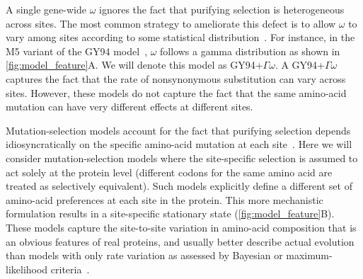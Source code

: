 \documentclass[11pt]{article}
\begin{document}
A single gene-wide $\omega$ ignores the fact that purifying selection is heterogeneous across sites.
The most common strategy to ameliorate this defect is to allow $\omega$ to vary among sites according to some statistical distribution~\citep{yang1994maximum,yang2000codon}.
For instance, in the M5 variant of the GY94 model~\citep{yang2000codon}, $\omega$ follows a gamma distribution as shown in \ref{fig:model_feature}A.
We will denote this model as GY94+$\Gamma\omega$.
A GY94+$\Gamma\omega$ captures the fact that the rate of nonsynonymous substitution can vary across sites. 
However, these models do not capture the fact that the same amino-acid mutation can have very different effects at different sites. 

Mutation-selection models account for the fact that purifying selection depends idiosyncratically on the specific amino-acid mutation at each site~\citep{halpern1998evolutionary,yang2008mutation,rodrigue2010mutation,tamuri2012estimating,mccandlish2014modeling}.
Here we will consider mutation-selection models where the site-specific selection is assumed to act solely at the protein level (different codons for the same amino acid are treated as selectively equivalent).
Such models explicitly define a different set of amino-acid preferences at each site in the protein. 
This more mechanistic formulation results in a site-specific stationary state (\ref{fig:model_feature}B). 
These models capture the site-to-site variation in amino-acid composition that is an obvious features of real proteins, and usually better describe actual evolution than models with only rate variation as assessed by Bayesian or maximum-likelihood criteria~\citep{lartillot2004bayesian, le2008phylogenetic, si2008empirical, wang2008class, rodrigue2010mutation,bloom2014experimentally,bloom2014informed,hilton2017phydms}.
\end{document}
